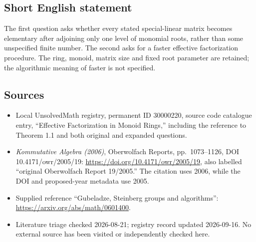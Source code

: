 \documentclass[11pt]{article}
\begin{document}
\subsection{Short English statement}
The first question asks whether every stated special-linear matrix becomes elementary after adjoining only one level of monomial roots, rather than some unspecified finite number. The second asks for a faster effective factorization procedure. The ring, monoid, matrix size and fixed root parameter are retained; the algorithmic meaning of faster is not specified.
\subsection{Sources}
\begin{itemize}
\item Local UnsolvedMath registry, permanent ID 30000220, source code catalogue entry, ``Effective Factorization in Monoid Rings,'' including the reference to Theorem 1.1 and both original and expanded questions.
\item \emph{Kommutative Algebra (2006)}, Oberwolfach Reports, pp.\ 1073--1126, DOI 10.4171/owr/2005/19: \url{https://doi.org/10.4171/owr/2005/19}, also labelled ``original Oberwolfach Report 19/2005.'' The citation uses 2006, while the DOI and proposed-year metadata use 2005.
\item Supplied reference ``Gubeladze, Steinberg groups and algorithms'': \url{https://arxiv.org/abs/math/0601400}.
\item Literature triage checked 2026-08-21; registry record updated 2026-09-16. No external source has been visited or independently checked here.
\end{itemize}
\end{document}
